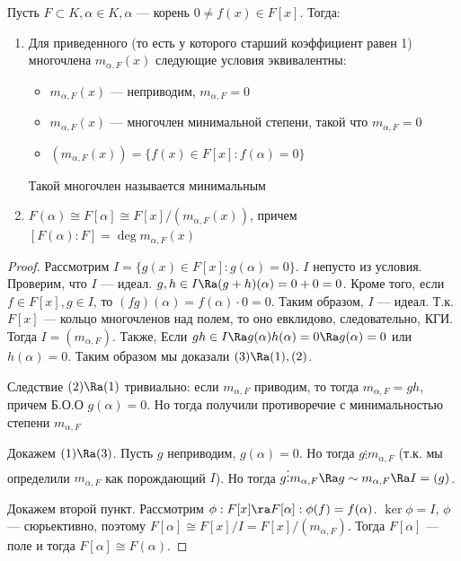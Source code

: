 \begin{theorem}
    Пусть \(F \subset K, \alpha \in K, \alpha\) --- корень \(0 \ne f(x) \in F[x]\). Тогда:
    \begin{enumerate}
        \item Для приведенного (то есть у которого старший коэффициент равен 1) многочлена \(m_{\alpha, F}(x)\) следующие условия эквивалентны:
        \begin{itemize}
            \item \(m_{\alpha, F}(x)\) --- неприводим, \(m_{\alpha, F} = 0\)
            \item \(m_{\alpha, F}(x)\) --- многочлен минимальной степени, такой что \(m_{\alpha, F} = 0\)
            \item \((m_{\alpha, F}(x)) = \{f(x) \in F[x]: f(\alpha) = 0\}\)
        \end{itemize}
        Такой многочлен называется минимальным
        \item \(F(\alpha) \cong F[\alpha] \cong F[x]/(m_{\alpha, F}(x))\), причем \([F(\alpha):F] = \deg m_{\alpha, F}(x)\)
    \end{enumerate}
\end{theorem}
\begin{proof}
    Рассмотрим \(I = \{g(x) \in F[x]: g(\alpha) = 0\}\). \(I\) непусто из условия. Проверим, что \(I\) --- идеал. \(g, h \in I \Ra (g + h)(\alpha) = 0 + 0 = 0\). Кроме того, если \(f \in F[x], g \in I\), то \((fg)(\alpha) = f(\alpha) \cdot 0 = 0\). Таким образом, \(I\) --- идеал. Т.к. \(F[x]\) --- кольцо многочленов над полем, то оно евклидово, следовательно, КГИ. Тогда \(I = (m_{\alpha, F})\). Также, Если \(gh \in I \Ra g(\alpha)h(\alpha) = 0 \Ra g(\alpha) = 0\) или \(h(\alpha) = 0\). Таким образом мы доказали \((3) \Ra (1), (2)\).
    
    Следствие \((2) \Ra (1)\) тривиально: если \(m_{\alpha, F}\) приводим, то тогда \(m_{\alpha, F} = gh\), причем Б.О.О \(g(\alpha) = 0\). Но тогда получили противоречие с минимальностью степени \(m_{\alpha, F}\)

    Докажем \((1) \Ra (3)\). Пусть \(g\) неприводим, \(g(\alpha) = 0\). Но тогда \(g \vdots m_{\alpha, F}\) (т.к. мы определили \(m_{\alpha, F}\) как порождающий \(I\)). Но тогда \(g \vdots m_{\alpha, F} \Ra g \sim m_{\alpha, F} \Ra I = (g)\).

    Докажем второй пункт. Рассмотрим \(\phi: F[x] \ra F[\alpha]: \phi(f) = f(\alpha)\). \(\ker \phi = I\), \(\phi\) --- сюрьективно, поэтому \(F[\alpha] \cong F[x]/I = F[x]/(m_{\alpha, F})\). Тогда \(F[\alpha]\) --- поле и тогда \(F[\alpha] \cong F(\alpha)\).
\end{proof}

